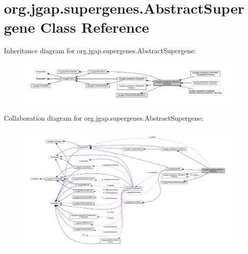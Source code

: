 \hypertarget{classorg_1_1jgap_1_1supergenes_1_1_abstract_supergene}{\section{org.\-jgap.\-supergenes.\-Abstract\-Supergene Class Reference}
\label{classorg_1_1jgap_1_1supergenes_1_1_abstract_supergene}
}


Inheritance diagram for org.\-jgap.\-supergenes.\-Abstract\-Supergene\-:
\nopagebreak
\begin{figure}[H]
\begin{center}
\leavevmode
\includegraphics[width=350pt]{classorg_1_1jgap_1_1supergenes_1_1_abstract_supergene__inherit__graph}
\end{center}
\end{figure}


Collaboration diagram for org.\-jgap.\-supergenes.\-Abstract\-Supergene\-:
\nopagebreak
\begin{figure}[H]
\begin{center}
\leavevmode
\includegraphics[width=350pt]{classorg_1_1jgap_1_1supergenes_1_1_abstract_supergene__coll__graph}
\end{center}
\end{figure}
